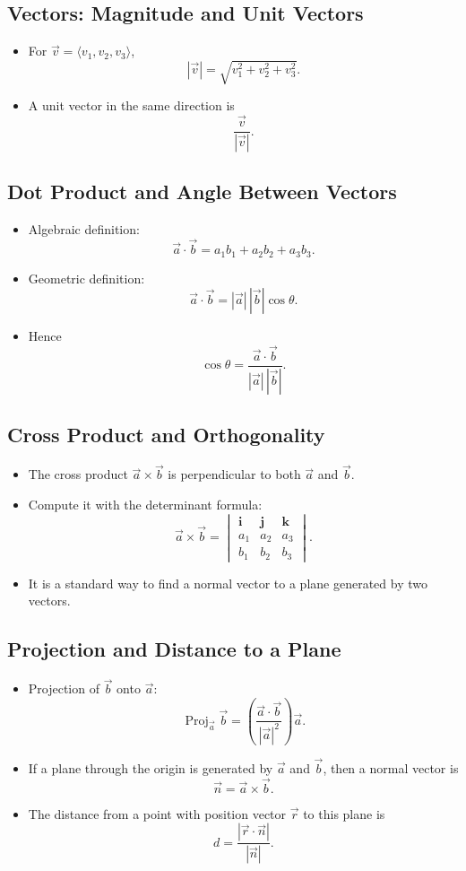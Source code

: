 \documentclass[11pt]{article}
\DeclareMathOperator{\Proj}{Proj}
\begin{document}
\subsection{Vectors: Magnitude and Unit Vectors}
\begin{itemize}
  \item For $\vec{v}=\langle v_1,v_2,v_3\rangle$,
  \[
  |\vec{v}|=\sqrt{v_1^2+v_2^2+v_3^2}.
  \]
  \item A unit vector in the same direction is
  \[
  \frac{\vec{v}}{|\vec{v}|}.
  \]
\end{itemize}

\subsection{Dot Product and Angle Between Vectors}
\begin{itemize}
  \item Algebraic definition:
  \[
  \vec{a}\cdot\vec{b}=a_1b_1+a_2b_2+a_3b_3.
  \]
  \item Geometric definition:
  \[
  \vec{a}\cdot\vec{b}=|\vec{a}|\,|\vec{b}|\cos\theta.
  \]
  \item Hence
  \[
  \cos\theta=\frac{\vec{a}\cdot\vec{b}}{|\vec{a}|\,|\vec{b}|}.
  \]
\end{itemize}

\subsection{Cross Product and Orthogonality}
\begin{itemize}
  \item The cross product $\vec{a}\times\vec{b}$ is perpendicular to both $\vec{a}$ and $\vec{b}$.
  \item Compute it with the determinant formula:
  \[
  \vec{a}\times\vec{b}=
  \begin{vmatrix}
  \mathbf{i} & \mathbf{j} & \mathbf{k}\\
  a_1 & a_2 & a_3\\
  b_1 & b_2 & b_3
  \end{vmatrix}.
  \]
  \item It is a standard way to find a normal vector to a plane generated by two vectors.
\end{itemize}

\subsection{Projection and Distance to a Plane}
\begin{itemize}
  \item Projection of $\vec{b}$ onto $\vec{a}$:
  \[
  \Proj_{\vec{a}}\vec{b}=\left(\frac{\vec{a}\cdot\vec{b}}{|\vec{a}|^2}\right)\vec{a}.
  \]
  \item If a plane through the origin is generated by $\vec{a}$ and $\vec{b}$, then a normal vector is
  \[
  \vec{n}=\vec{a}\times\vec{b}.
  \]
  \item The distance from a point with position vector $\vec{r}$ to this plane is
  \[
  d=\frac{|\vec{r}\cdot\vec{n}|}{|\vec{n}|}.
  \]
\end{itemize}
\end{document}
